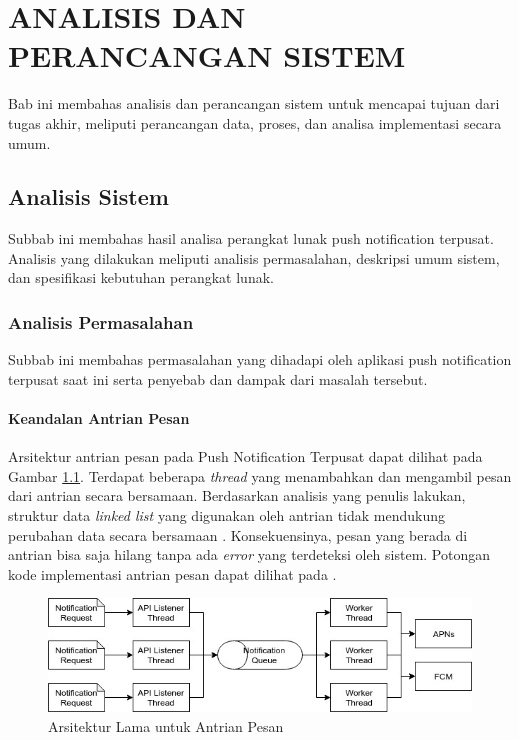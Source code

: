 \chapter{ANALISIS DAN PERANCANGAN SISTEM}
\par Bab ini membahas analisis dan perancangan sistem untuk mencapai tujuan dari tugas akhir, meliputi perancangan data, proses, dan analisa implementasi secara umum.

\section{Analisis Sistem}
\par Subbab ini membahas hasil analisa perangkat lunak push notification terpusat.
Analisis yang dilakukan meliputi analisis permasalahan, deskripsi umum sistem, dan spesifikasi kebutuhan perangkat lunak.

\subsection{Analisis Permasalahan}
\par Subbab ini membahas permasalahan yang dihadapi oleh aplikasi push notification terpusat saat ini serta penyebab dan dampak dari masalah tersebut.

\subsubsection{Keandalan Antrian Pesan}
\par Arsitektur antrian pesan pada Push Notification Terpusat dapat dilihat pada Gambar \ref{arsitektur_message_queue_lama}. Terdapat beberapa \textit{thread} yang menambahkan dan mengambil pesan dari antrian secara bersamaan. Berdasarkan analisis yang penulis lakukan, struktur data \textit{linked list} yang digunakan oleh antrian tidak mendukung perubahan data secara bersamaan \cite{linkedlist-online}. Konsekuensinya, pesan yang berada di antrian bisa saja hilang tanpa ada \textit{error} yang terdeteksi oleh sistem. Potongan kode implementasi antrian pesan dapat dilihat pada .
\begin{figure}[H]
	\caption{Arsitektur Lama untuk Antrian Pesan} \label{arsitektur_message_queue_lama}
	\includegraphics[width=1\textwidth]{bab3/figures/arsitektur_message_queue_lama.jpg}
\end{figure}

